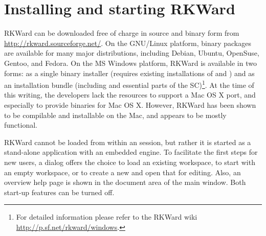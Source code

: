 \section{Installing and starting RKWard}
\label{sec:installing_starting_RKWard}
RKWard can be downloaded free of charge in source and binary form from \url{http://rkward.sourceforge.net/}. 
On the GNU/Linux platform, binary packages are available for many major distributions,
including Debian, Ubuntu, OpenSuse, Gentoo, and Fedora. On the MS Windows
platform, RKWard is available in two forms: as a single binary
installer (requires existing installations of
 and ) and
as an installation bundle (including  and
essential parts of the  SC)\footnote{For detailed information please refer to the 
RKWard wiki \url{http://p.sf.net/rkward/windows}.}. At the time of
this writing, the developers lack the resources to support a Mac OS X
port, and especially to provide binaries for Mac OS X. However, RKWard
has been shown to be compilable and installable on the Mac, and appears
to be mostly functional.

RKWard cannot be loaded from within an 
session, but rather it is started as a stand-alone application with an
embedded  engine. To facilitate the first
steps for new users, a dialog offers the choice to load an existing
workspace, to start with an empty workspace, or to create a new
 and open that for editing. Also, an overview help page is
shown in the document area of the main window. Both start-up features
can be turned off.
